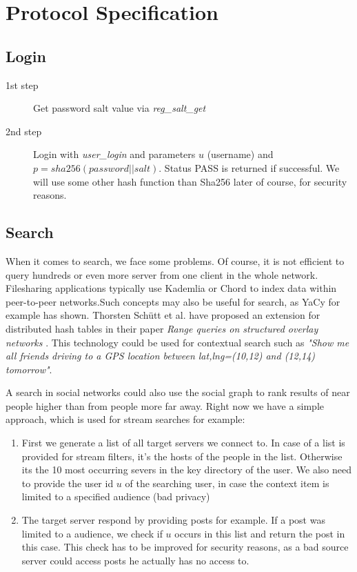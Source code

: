\documentclass{scrartcl}
\begin{document}
\clearpage
\section{Protocol Specification \label{protocol}}

\subsection{Login}

\begin{description}
  \item[1st step] Get password salt value via \textit{reg\_salt\_get}
  \item[2nd step] Login with \textit{user\_login} and parameters $u$ (username) and $p = sha256(password||salt)$. Status PASS is returned if successful.
We will use some other hash function than Sha256 later of course, for security reasons.

\end{description}


  \subsection{Search}
  When it comes to search, we face some problems. Of course, it is not efficient to query hundreds or even more server from one client in the whole network. Filesharing applications typically use Kademlia  or Chord to index data within peer-to-peer networks.Such concepts may also be useful for search, as YaCy for example has shown. Thorsten Schütt et al. have proposed an extension for distributed hash tables in their paper \textit{Range queries on structured overlay networks} \cite{schuett}. This technology could be used for contextual search such as \textit{"Show me all friends driving to a GPS location between lat,lng=(10,12) and (12,14) tomorrow"}.
  
  
   A search in social networks could also use the social graph to rank results of near people higher than from people more far away. Right now we have a simple approach, which is used for stream searches for example:
  \begin{enumerate}
  \item First we generate a list of all target servers we connect to. In case of a list is provided for stream filters, it's the hosts of the people in the list. Otherwise its the 10 most occurring severs in the key directory of the user. We also need to provide the user id $u$ of the searching user, in case the context item is limited to a specified audience (bad privacy)
  \item The target server respond by providing posts for example. If a post was limited to a audience, we check if $u$ occurs in this list and return the post in this case. This check has to be improved for security reasons, as a bad source server could access posts he actually has no access to.
  
  \end{enumerate}
  
\end{document}

